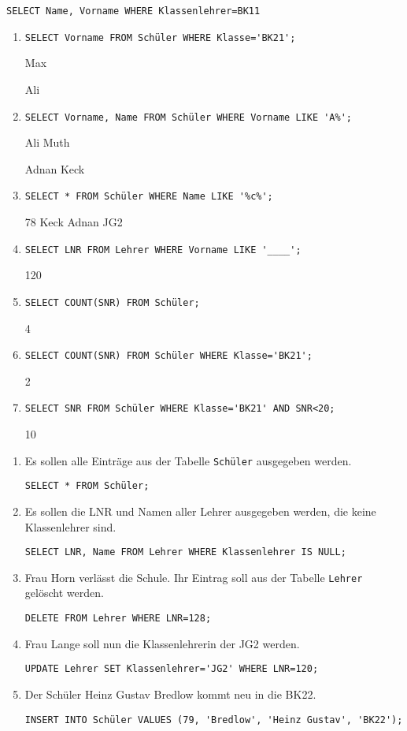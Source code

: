\documentclass[a4paper,12pt, headsepline, ngerman]{scrartcl}
\begin{document}
    \begin{Exercise}[title={Franz hat versucht einen SQL-Befehl zu erstellen, der Namen und Vornamen des Klassenlehrers der BK11 ausgibt. Finde die 3 Fehler und verbessere sie. (6P)}, label=KA_SQL_A4]

    \lstinline!SELECT Name, Vorname WHERE Klassenlehrer=BK11!
    \end{Exercise}

	\begin{Answer}[ref=KA_SQL_A1]
			\begin{enumerate}[label=\alph*)]
				\item \lstinline!SELECT Vorname FROM Schüler WHERE Klasse='BK21';!
				
				Max
				
				Ali
				\item \lstinline!SELECT Vorname, Name FROM Schüler WHERE Vorname LIKE 'A%';!
				
				Ali Muth
				
				Adnan Keck
				\item \lstinline!SELECT * FROM Schüler WHERE Name LIKE '%c%';!
				
				78 Keck Adnan JG2
				\item \lstinline!SELECT LNR FROM Lehrer WHERE Vorname LIKE '____';!
				
				120
				\item \lstinline!SELECT COUNT(SNR) FROM Schüler;!
				
				4
				\item \lstinline!SELECT COUNT(SNR) FROM Schüler WHERE Klasse='BK21';!
				
				2
				\item \lstinline!SELECT SNR FROM Schüler WHERE Klasse='BK21' AND SNR<20;!
				
				10
			\end{enumerate}
	\end{Answer}%
	\begin{Answer}[ref=KA_SQL_A2]
		\begin{enumerate}[label=\alph*)]
			\item Es sollen alle Einträge aus der Tabelle \lstinline!Schüler! ausgegeben werden.
			
			\lstinline!SELECT * FROM Schüler;!
			\item Es sollen die LNR und Namen aller Lehrer ausgegeben werden, die keine Klassenlehrer sind.
			
			\lstinline!SELECT LNR, Name FROM Lehrer WHERE Klassenlehrer IS NULL;!
			\item Frau Horn verlässt die Schule. Ihr Eintrag soll aus der Tabelle \lstinline!Lehrer! gelöscht werden.
			
			\lstinline!DELETE FROM Lehrer WHERE LNR=128;!
			\item Frau Lange soll nun die Klassenlehrerin der JG2 werden.
			
			\lstinline!UPDATE Lehrer SET Klassenlehrer='JG2' WHERE LNR=120;!
			\item Der Schüler Heinz Gustav Bredlow kommt neu in die BK22.
			
			\lstinline!INSERT INTO Schüler VALUES (79, 'Bredlow', 'Heinz Gustav', 'BK22');!
		\end{enumerate}
	\end{Answer}%
\end{document}
